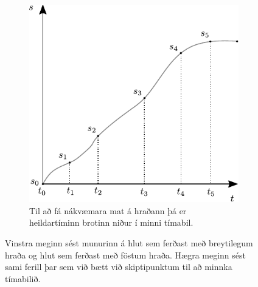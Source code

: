 \ifdefined \wholebook \else\documentclass[oneside]{book}\usepackage{EdlBook}\graphicspath{{figures/}}
\begin{document}
\begin{figure}[H]
\begin{subfigure}[h]{.4\textwidth}
    \includegraphics[width=\linewidth]{figures/stodutimagraf-skiptingar.pdf}
    \caption{Til að fá nákvæmara mat á hraðann þá er heildartíminn brotinn niður í minni tímabil.}
    \label{fig:st-skiptingar}
\end{subfigure}
\caption{Vinstra meginn sést munurinn á hlut sem ferðast með breytilegum hraða og hlut sem ferðast með föstum hraða. Hægra meginn sést sami ferill þar sem við bætt við skiptipunktum til að minnka tímabilið.}
\end{figure}
\end{document}
